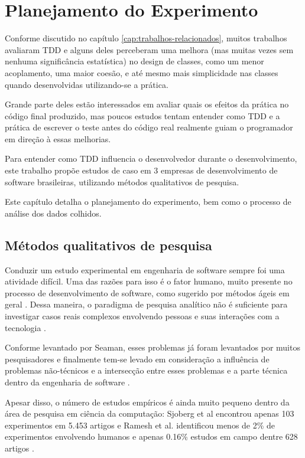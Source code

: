 \chapter{Planejamento do Experimento}
\label{cap:planejamento}

Conforme discutido no capítulo \ref{cap:trabalhos-relacionados}, muitos 
trabalhos avaliaram TDD e alguns deles perceberam uma melhora (mas muitas vezes
sem nenhuma significância estatística) no design de classes, como um menor 
acoplamento, uma maior coesão, e até mesmo mais simplicidade nas classes quando
desenvolvidas utilizando-se a prática. 

Grande parte deles estão interessados em avaliar quais os efeitos da prática
no código final produzido, mas poucos estudos tentam entender como TDD e a
prática de escrever o teste antes do código real realmente guiam o programador 
em direção à essas melhorias.

Para entender como TDD influencia o desenvolvedor durante o desenvolvimento,
este trabalho propõe estudos de caso em 3 empresas de desenvolvimento de
software brasileiras, utilizando métodos qualitativos de pesquisa.

Este capítulo detalha o planejamento do experimento, bem como o processo de
análise dos dados colhidos.

\section{Métodos qualitativos de pesquisa} 
\label{sec:planejamento-qualitativa}

Conduzir um estudo experimental em engenharia de software sempre foi uma
atividade difícil. Uma das razões para isso é o fator humano, muito presente 
no processo de desenvolvimento de software, como sugerido por métodos ágeis  em
geral \cite{AgileManifesto}. Dessa maneira, o paradigma de pesquisa analítico 
não é suficiente para investigar casos reais complexos envolvendo pessoas e 
suas interações com a tecnologia \cite{guidelines-case-study}.

Conforme levantado por Seaman, esses problemas já foram levantados por muitos
pesquisadores e finalmente tem-se levado em consideração a influência de
problemas não-técnicos e a intersecção entre esses problemas e a parte técnica
dentro da engenharia de software \cite{seaman}. 

Apesar disso, o número de estudos empíricos é ainda muito pequeno dentro da área
de pesquisa em ciência da computação: Sjoberg et al encontrou apenas 103
experimentos em 5.453 artigos \cite{sjoberg} e Ramesh et al. identificou menos
de 2\% de experimentos envolvendo humanos e apenas 0.16\% estudos em campo 
dentre 628 artigos \cite{ramesh} .

